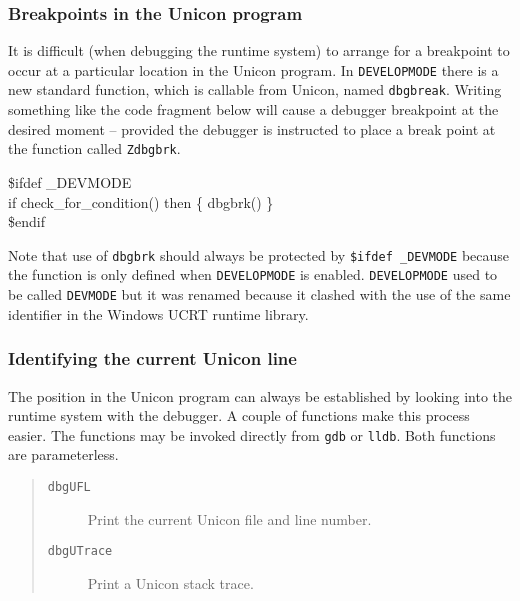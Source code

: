 \subsubsection{Breakpoints in the Unicon program}
It is difficult (when debugging the runtime system) to arrange for a breakpoint
to occur at a particular location in the Unicon program. In \texttt{DEVELOPMODE}
there is a new standard function, which is callable from Unicon, named
\texttt{dbgbreak}. Writing something like the code fragment below will
cause a debugger breakpoint at the desired moment -- provided the debugger is
instructed to place a break point at the function called \texttt{Zdbgbrk}.
\begin{iconcode}
\$ifdef \_DEVMODE\\
\>if check\_for\_condition() then \{ dbgbrk() \}\\
\$endif\\
\end{iconcode}
Note that use of \texttt{dbgbrk} should always be protected by
\texttt{\$ifdef \_DEVMODE} because the function is only defined when
\texttt{DEVELOPMODE} is enabled. \texttt{DEVELOPMODE} used to be called \texttt{DEVMODE}
but it was renamed because it clashed with the use of the same identifier in the Windows
UCRT runtime library.
\subsubsection{Identifying the current Unicon line}
The position in the Unicon program can always be established by looking into the
runtime system with the debugger. A couple of functions make this process
easier. The functions may be invoked directly from \texttt{gdb} or \texttt{lldb}.
Both functions are parameterless.
\begin{quote}
\begin{description}
\item[\texttt{dbgUFL}] Print the current Unicon file and line number.
\item[\texttt{dbgUTrace}] Print a Unicon stack trace.
\end{description}
\end{quote}

